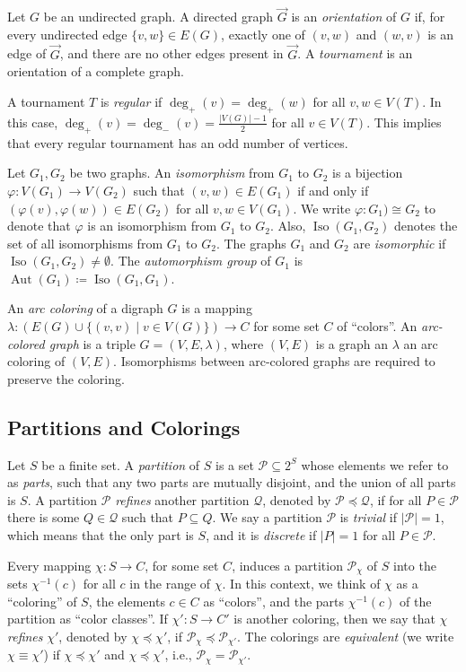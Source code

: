 \documentclass{theoretics}
\newcommand{\CP}{{\mathcal P}}
\newcommand{\CQ}{{\mathcal Q}}
\DeclareMathOperator{\Aut}{Aut}
\DeclareMathOperator{\Iso}{Iso}
\begin{document}
Let $G$ be an undirected graph.
A directed graph $\vec{G}$ is an \emph{orientation} of $G$ if, for every undirected edge $\{v,w\} \in E(G)$,
exactly one of $(v,w)$ and $(w,v)$ is an edge of $\vec{G}$, and there are no other edges present in $\vec{G}$.
A \emph{tournament} is an orientation of a complete graph.

A tournament $T$ is \emph{regular} if $\deg_+(v) = \deg_+(w)$ for all $v,w \in V(T)$.
In this case, $\deg_+(v) = \deg_-(v) = \frac{|V(G)|-1}{2}$ for all $v \in V(T)$.
This implies that every regular tournament has an odd number of vertices.

Let $G_1,G_2$ be two graphs.
An \emph{isomorphism} from $G_1$ to $G_2$ is a bijection $\varphi\colon V(G_1) \to V(G_2)$ such that $(v,w) \in E(G_1)$ if and only if $(\varphi(v),\varphi(w)) \in E(G_2)$ for all $v,w \in V(G_1)$.
We write $\varphi\colon G_1) \cong G_2$ to denote that $\varphi$ is an isomorphism from $G_1$ to $G_2$.
Also, $\Iso(G_1,G_2)$ denotes the set of all isomorphisms from $G_1$ to $G_2$.
The graphs $G_1$ and $G_2$ are \emph{isomorphic} if $\Iso(G_1,G_2) \neq \emptyset$.
The \emph{automorphism group} of $G_1$ is $\Aut(G_1) \coloneqq \Iso(G_1,G_1)$.

An \emph{arc coloring} of a digraph $G$ is a mapping $\lambda\colon (E(G) \cup \{(v,v)\mid v\in V(G)\}) \to C$ for some set $C$ of ``colors''.
An \emph{arc-colored graph} is a triple $G=(V,E,\lambda)$, where $(V,E)$ is a graph an $\lambda$ an arc coloring of $(V,E)$.
Isomorphisms between arc-colored graphs are required to preserve the coloring.


\subsection{Partitions and Colorings}

Let $S$ be a finite set.
A \emph{partition} of $S$ is a set $\CP\subseteq 2^S$ whose elements we refer to as \emph{parts},
such that any two parts are mutually disjoint, and the union of all parts is $S$.
A partition $\CP$ \emph{refines} another partition $\CQ$, denoted by $\CP \preceq \CQ$, if for all $P \in \CP$ there is some $Q \in \CQ$ such that $P \subseteq Q$.
We say a partition $\CP$ is \emph{trivial} if $|\CP| = 1$, which means that the only part is $S$, and it is \emph{discrete} if $|P| = 1$ for all $P \in \CP$.

Every mapping $\chi\colon S\to C$, for some set $C$, induces a partition $\CP_\chi$ of $S$ into the sets $\chi^{-1}(c)$ for all $c$ in the range of $\chi$.
In this context, we think of $\chi$ as a ``coloring'' of $S$, the elements $c\in C$ as ``colors'', and the parts $\chi^{-1}(c)$ of the partition as ``color classes''.
If $\chi'\colon S\to C'$ is another coloring, then we say that $\chi$ \emph{refines} $\chi'$, denoted by $\chi \preceq \chi'$, if $\CP_\chi \preceq \CP_{\chi'}$.
The colorings are \emph{equivalent} (we write $\chi \equiv \chi'$) if $\chi \preceq \chi'$ and $\chi \preceq \chi'$, i.e., $\CP_\chi = \CP_{\chi'}$.
\end{document}
